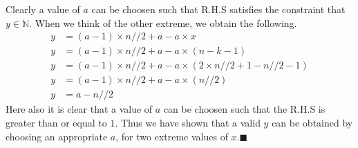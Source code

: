 \documentclass[12pt, twoside]{article}
\begin{document}
Clearly a value of $a$ can be choosen such that R.H.S satisfies the constraint that $y \in \mathbb{N}$. When we think of the other extreme, we obtain the following.
\begin{align*}
	y &= (a-1)\times n//2 + a - a\times x \\
	y &= (a-1)\times n//2 + a - a\times (n-k-1) \\
	y &= (a-1)\times n//2 + a - a\times (2\times n//2 + 1-n//2-1) \\
	y &= (a-1)\times n//2 + a - a\times (n//2) \\
	y &= a - n//2
\end{align*}
Here also it is clear that a value of \textbf{$a$} can be choosen such that the R.H.S is greater than or equal to $1$. \newline
Thus we have shown that a valid $y$ can be obtained by choosing an appropriate $a$, for two extreme values of $x$.$\blacksquare$
\end{document}
